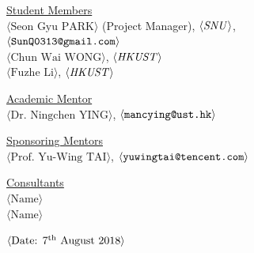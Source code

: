 \begin{center}
\vspace{0.35in}
\underline {Student Members}\\
\vspace{5pt}
$\langle \text{Seon Gyu PARK}\rangle$ (Project Manager), $\langle \text{\emph{SNU}}\rangle$,\\ 
\vspace{3pt}
$\langle \text{\texttt{SunQ0313@gmail.com}} \rangle$\\
\vspace{5pt}
$\langle \text{Chun Wai WONG}\rangle$, $\langle \text{\emph{HKUST}} \rangle$ \\
\vspace{3pt}
$\langle \text{Fuzhe Li}\rangle$, $\langle \text{\emph{HKUST}} \rangle$ \\
\vspace{3pt}


\vspace \shiftdownb
\underline {Academic Mentor} \\
\vspace{5pt}
$\langle \text{Dr. Ningchen YING}\rangle$, $\langle \text{\texttt{mancying@ust.hk}} \rangle$

\vspace \shiftdownb
\underline {Sponsoring Mentors}\\
\vspace{5pt}
$\langle \text{Prof. Yu-Wing TAI}\rangle$, $\langle \text{\texttt{yuwingtai@tencent.com}} \rangle$\\
\vspace{3pt}


\vspace \shiftdownb
\underline {Consultants}\\
\vspace{5pt}
$\langle \text{Name}\rangle$\\
\vspace{3pt}
$\langle \text{Name}\rangle$

\vspace \shiftdowna
$\langle \text{Date: $7^{\textnormal{th}}$ August 2018}\rangle$ 

\end{center}

 
